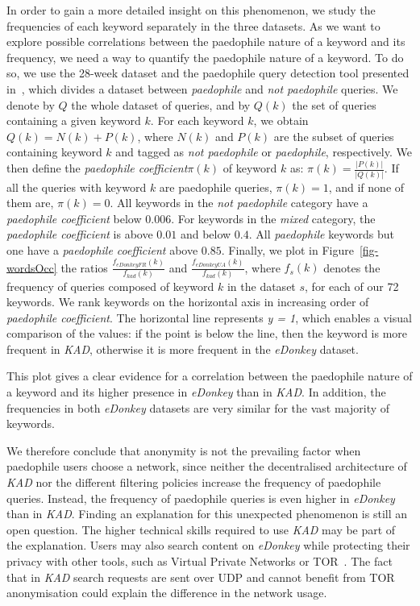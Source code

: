 \documentclass[a4paper,oneside,12pt]{article}
\newcommand{\edonkey}{{\em eDonkey}\xspace}
\newcommand{\kad}{{\em KAD}\xspace}
\newcommand{\paedocoeff}{{\em paedophile coefficient}\xspace}
\newcommand{\paedo}{{\em paedophile}\xspace}
\newcommand{\notpaedo}{{\em not paedophile}\xspace}
\newcommand{\mixed}{{\em mixed}\xspace}
\newcommand{\ipm}{\cite{QuantifyingIPM}\xspace}
\begin{document}
In order to gain a more detailed insight on this phenomenon, we study the frequencies of each keyword separately in the three datasets. As we want to explore possible correlations between the paedophile nature of a keyword and its frequency, we need a way to quantify the paedophile nature of a keyword. To do so, we use the 28-week dataset and the paedophile query detection tool presented in~\ipm, which divides a dataset between \paedo and \notpaedo queries. We denote by $Q$ the whole dataset of queries, and by $Q(k)$ the set of queries containing a given keyword $k$. For each keyword $k$, we obtain $Q(k) = N(k) + P(k)$, where $N(k)$ and $P(k)$ are the subset of queries containing keyword $k$ and tagged as \notpaedo or \paedo, respectively. We then define the \paedocoeff $\pi(k)$ of keyword $k$ as: $\pi(k) = \frac{|P(k)|}{|Q(k)|}$. If all the queries with keyword $k$ are paedophile queries, $\pi(k) = 1$, and if none of them are, $\pi(k)=0$. All keywords in the \notpaedo category have a \paedocoeff below $0.006$. For keywords in the \mixed category, the \paedocoeff is above $0.01$ and below $0.4$. All \paedo keywords but one have a \paedocoeff above $0.85$. Finally, we plot in Figure~\ref{fig-wordsOcc} the ratios $\frac{f_{eDonkeyFR}(k)}{f_{kad}(k)}$ and $\frac{f_{eDonkeyUA}(k)}{f_{kad}(k)}$, where $f_s(k)$ denotes the frequency of queries composed of keyword $k$ in the dataset $s$, for each of our 72 keywords. We rank keywords on the horizontal axis in increasing order of \paedocoeff. The horizontal line represents {\em y = 1}, which enables a visual comparison of the values: if the point is below the line, then the keyword is more frequent in \kad, otherwise it is more frequent in the \edonkey dataset. 

This plot gives a clear evidence for a correlation between the paedophile nature of a keyword and its higher presence in \edonkey than in \kad. In addition, the frequencies in both \edonkey datasets are very similar for the vast majority of keywords.



We therefore conclude that anonymity is not the prevailing factor when paedophile users choose a network, since neither the decentralised architecture of \kad nor the different filtering policies increase the frequency of paedophile queries. Instead, the frequency of paedophile queries is even higher in \edonkey than in \kad. Finding an explanation for this unexpected phenomenon is still an open question. The higher technical skills required to use \kad may be part of the explanation. Users may also search content on \edonkey while protecting their privacy with other tools, such as Virtual Private Networks or TOR~\cite{torproject}. The fact that in \kad search requests are sent over UDP and cannot benefit from TOR anonymisation could explain the difference in the network usage. 
\end{document}
